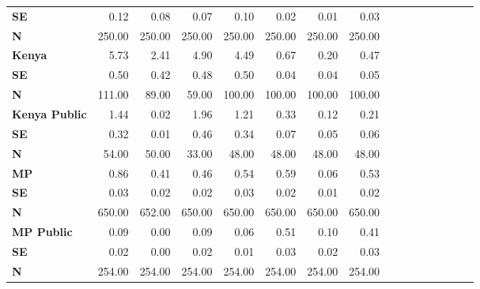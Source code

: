 \begin{tabular}{@{\extracolsep{5pt}}lrrrrrrrrrrrrrrr}
{\bf SE} & 0.12\phantom{***} & 0.08\phantom{***} & 0.07\phantom{***} & 0.10\phantom{***} & 0.02\phantom{***} & 0.01\phantom{***} & 0.03\phantom{***} \\
{\bf N} & 250.00\phantom{***} & 250.00\phantom{***} & 250.00\phantom{***} & 250.00\phantom{***} & 250.00\phantom{***} & 250.00\phantom{***} & 250.00\phantom{***} \\
{\bf Kenya} & 5.73\phantom{***} & 2.41\phantom{***} & 4.90\phantom{***} & 4.49\phantom{***} & 0.67\phantom{***} & 0.20\phantom{***} & 0.47\phantom{***} \\
{\bf SE} & 0.50\phantom{***} & 0.42\phantom{***} & 0.48\phantom{***} & 0.50\phantom{***} & 0.04\phantom{***} & 0.04\phantom{***} & 0.05\phantom{***} \\
{\bf N} & 111.00\phantom{***} & 89.00\phantom{***} & 59.00\phantom{***} & 100.00\phantom{***} & 100.00\phantom{***} & 100.00\phantom{***} & 100.00\phantom{***} \\
{\bf Kenya Public} & 1.44\phantom{***} & 0.02\phantom{***} & 1.96\phantom{***} & 1.21\phantom{***} & 0.33\phantom{***} & 0.12\phantom{***} & 0.21\phantom{***} \\
{\bf SE} & 0.32\phantom{***} & 0.01\phantom{***} & 0.46\phantom{***} & 0.34\phantom{***} & 0.07\phantom{***} & 0.05\phantom{***} & 0.06\phantom{***} \\
{\bf N} & 54.00\phantom{***} & 50.00\phantom{***} & 33.00\phantom{***} & 48.00\phantom{***} & 48.00\phantom{***} & 48.00\phantom{***} & 48.00\phantom{***} \\
{\bf MP} & 0.86\phantom{***} & 0.41\phantom{***} & 0.46\phantom{***} & 0.54\phantom{***} & 0.59\phantom{***} & 0.06\phantom{***} & 0.53\phantom{***} \\
{\bf SE} & 0.03\phantom{***} & 0.02\phantom{***} & 0.02\phantom{***} & 0.03\phantom{***} & 0.02\phantom{***} & 0.01\phantom{***} & 0.02\phantom{***} \\
{\bf N} & 650.00\phantom{***} & 652.00\phantom{***} & 650.00\phantom{***} & 650.00\phantom{***} & 650.00\phantom{***} & 650.00\phantom{***} & 650.00\phantom{***} \\
{\bf MP Public} & 0.09\phantom{***} & 0.00\phantom{***} & 0.09\phantom{***} & 0.06\phantom{***} & 0.51\phantom{***} & 0.10\phantom{***} & 0.41\phantom{***} \\
{\bf SE} & 0.02\phantom{***} & 0.00\phantom{***} & 0.02\phantom{***} & 0.01\phantom{***} & 0.03\phantom{***} & 0.02\phantom{***} & 0.03\phantom{***} \\
{\bf N} & 254.00\phantom{***} & 254.00\phantom{***} & 254.00\phantom{***} & 254.00\phantom{***} & 254.00\phantom{***} & 254.00\phantom{***} & 254.00\phantom{***} \\

\end{tabular}
